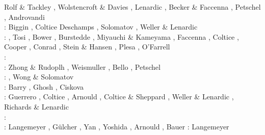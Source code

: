 \begin{scriptsize}
                    Rolf \& Tackley \cite{rota11}, Wolstencroft \& Davies \cite{woda11},
                    Lenardic \etal \cite{lemj11}, Becker \& Faccenna \cite{befa11},
                    Petschel \etal \cite{pewb11}, Androvandi \etal \cite{andl11}\\
\twothousandtwelve: Biggin \etal \cite{bisa12}, Coltice \etal \cite{cort12b}
                    Deschamps \etal \cite{deyt12}, Solomatov \cite{solo12}, 
                    Weller \& Lenardic \cite{wele12}\\
\twothousandthirteen: \cite{holj13}\cite{dadb13}, 
                      Tosi \etal \cite{toyd13}, Bower \etal \cite{bogs13a},
                      Burstedde \etal \cite{busa13}, Miyauchi \& Kameyama \cite{mika13},
                      Faccenna \etal \cite{fabc13}, Coltice \cite{cosr13},
                      Cooper \etal \cite{coml13}, Conrad \etal \cite{cost13},
                      Stein \& Hansen \cite{stha13}, Plesa \etal \cite{plth13},
                      O'Farrell \etal \cite{oflb13}\\
\twothousandfourteen: \cite{arfw14}\cite{helo14}\cite{crta14}\cite{flgw14}
                      \cite{roct14}\cite{cort14}\cite{becr14}
                      \cite{nata14}\cite{stha14}\cite{stlh14}\cite{ogaw14}\\
\twothousandfifteen: Zhong \& Rudoplh \cite{zhru15}, Weismuller \etal \cite{wegg15},
                     Bello \etal \cite{bect15}, Petschel \etal \cite{pesw15}\\
\twothousandsixteen: \cite{frbs16}\cite{sisc16}\cite{boba16}\cite{wele16}\cite{welm16}
                     \cite{vade16}\cite{chah16}, Wong \& Solomatov \cite{woso16b}\\
\twothousandseventeen: Barry \etal \cite{badw17}, Ghosh \etal \cite{ghts17}, 
                       Ciskova \etal \cite{civj17}\\
\twothousandeighteen: Guerrero \etal \cite{guld18}, Coltice \etal \cite{cold18}, 
                      Arnould \etal \cite{arcf18}, Coltice \& Sheppard \cite{cosh18}, 
                      Weller \& Lenardic \cite{wele18}, Richards \& Lenardic \cite{rile18}\\
\twothousandnineteen: \cite{gult19}\cite{mazh19}\cite{cohf19}\cite{lewh19}\cite{ulcw19}\cite{boba19}\cite{fube19}
      \cite{plju19}\\
\twothousandtwenty: Langemeyer \etal \cite{lalt20}, G\"ulcher \etal \cite{gugb20}, 
                    Yan \etal \cite{yabt20}, Yoshida \etal \cite{yosy20}, 
                    Arnould \etal \cite{arcf20}, Bauer \etal \cite{babd20}
\twothousandone: Langemeyer \etal \cite{lalt21}
\end{scriptsize}

